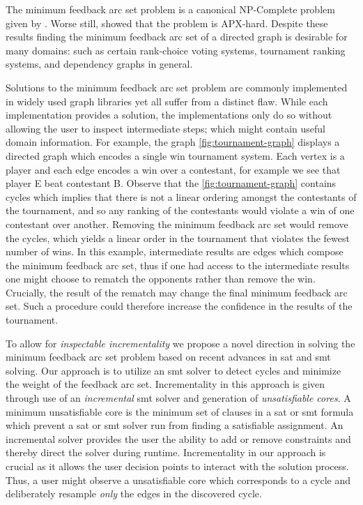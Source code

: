 \label{section:introduction}%

The minimum feedback arc set problem is a canonical NP-Complete problem given by
\citet{KarpNPComplete}. Worse still, \citet{kannthesis} showed that the problem
is APX-hard. Despite these results finding the minimum feedback arc set of a
directed graph is desirable for many domains: such as certain rank-choice voting
systems, tournament ranking systems, and dependency graphs
in general.

Solutions to the minimum feedback arc set problem are commonly implemented in
widely used graph libraries yet all suffer from a distinct flaw. While each
implementation provides a solution, the implementations only do so without
allowing the user to inspect intermediate steps; which might contain useful
domain information. For example, the graph \autoref{fig:tournament-graph}
displays a directed graph which encodes a single win tournament system. Each
vertex is a player and each edge encodes a win over a contestant, for example we
see that player E beat contestant B. Observe that the
\autoref{fig:tournament-graph} contains cycles which implies that there is not a
linear ordering amongst the contestants of the tournament, and so any ranking of
the contestants would violate a win of one contestant over another. Removing the
minimum feedback arc set would remove the cycles, which yields a linear order in
the tournament that violates the fewest number of wins. In this example,
intermediate results are edges which compose the minimum feedback arc set, thus
if one had access to the intermediate results one might choose to rematch the
opponents rather than remove the win. Crucially, the result of the rematch may
change the final minimum feedback arc set. Such a procedure could therefore
increase the confidence in the results of the tournament.

To allow for \emph{inspectable incrementality} we propose a novel direction in
solving the minimum feedback arc set problem based on recent advances in
\ac{sat} and \ac{smt} solving. Our approach is to utilize an \ac{smt} solver to
detect cycles and minimize the weight of the feedback arc set. Incrementality in
this approach is given through use of an \emph{incremental} \ac{smt} solver and
generation of \emph{unsatisfiable cores}. A minimum unsatisfiable core is the
minimum set of clauses in a \ac{sat} or \ac{smt} formula which prevent a
\ac{sat} or \ac{smt} solver run from finding a satisfiable assignment. An
incremental solver provides the user the ability to add or remove constraints
and thereby direct the solver during runtime. Incrementality in our approach is
crucial as it allows the user decision points to interact with the solution
process. Thus, a user might observe a unsatisfiable core which corresponds to a
cycle and deliberately resample \emph{only} the edges in the discovered cycle.

